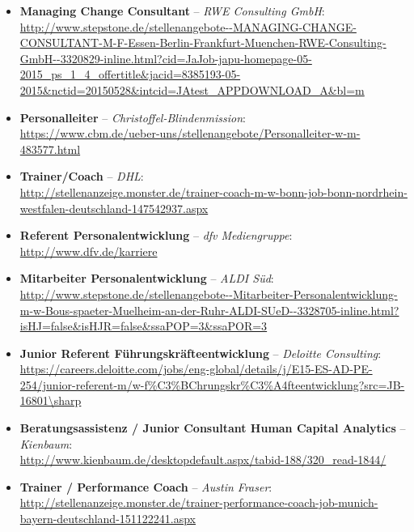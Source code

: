 \documentclass[11pt,a4paper]{article}
\begin{document}
\begin{itemize}

\item \textbf{Managing Change Consultant} -- \textsl{RWE Consulting GmbH}:\\ \textsf{\textcolor{MidnightBlue}{\url{http://www.stepstone.de/stellenangebote--MANAGING-CHANGE-CONSULTANT-M-F-Essen-Berlin-Frankfurt-Muenchen-RWE-Consulting-GmbH--3320829-inline.html?cid=JaJob-japu-homepage-05-2015_ps_1_4_offertitle&jacid=8385193-05-2015&nctid=20150528&intcid=JAtest_APPDOWNLOAD_A&bl=m}}}

\item \textbf{Personalleiter} -- \textsl{Christoffel-Blindenmission}:\\
\textsf{\textcolor{MidnightBlue}{\url{https://www.cbm.de/ueber-uns/stellenangebote/Personalleiter-w-m-483577.html}}}

\item \textbf{Trainer/Coach} -- \textsl{DHL}:\\
\textsf{\textcolor{MidnightBlue}{\url{http://stellenanzeige.monster.de/trainer-coach-m-w-bonn-job-bonn-nordrhein-westfalen-deutschland-147542937.aspx}}}

\item \textbf{Referent Personalentwicklung} -- \textsl{dfv Mediengruppe}:\\
\textsf{\textcolor{MidnightBlue}{\url{http://www.dfv.de/karriere}}}

\item \textbf{Mitarbeiter Personalentwicklung} -- \textsl{ALDI Süd}:\\
\textsf{\textcolor{MidnightBlue}{\url{http://www.stepstone.de/stellenangebote--Mitarbeiter-Personalentwicklung-m-w-Bous-spaeter-Muelheim-an-der-Ruhr-ALDI-SUeD--3328705-inline.html?isHJ=false\&isHJR=false&ssaPOP=3\&ssaPOR=3}}}

\item \textbf{Junior Referent Führungskräfteentwicklung} -- \textsl{Deloitte Consulting}:\\
\textsf{\textcolor{MidnightBlue}{\url{https://careers.deloitte.com/jobs/eng-global/details/j/E15-ES-AD-PE-254/junior-referent-m/w-f\%C3\%BChrungskr\%C3\%A4fteentwicklung?src=JB-16801\sharp}}}

\item \textbf{Beratungsassistenz / Junior Consultant Human Capital Analytics} -- \textsl{Kienbaum}:\\
\textsf{\textcolor{MidnightBlue}{\url{http://www.kienbaum.de/desktopdefault.aspx/tabid-188/320_read-1844/}}}

\item \textbf{Trainer / Performance Coach} -- \textsl{Austin Fraser}:\\
\textsf{\textcolor{MidnightBlue}{\url{http://stellenanzeige.monster.de/trainer-performance-coach-job-munich-bayern-deutschland-151122241.aspx}}}

\end{itemize}
\end{document}

